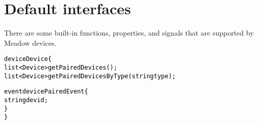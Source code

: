 \documentclass{note}
\begin{document}

\section{Default interfaces}
There are some built-in functions, properties, and signals that are
supported by Meadow devices. 
\begin{alltt}
  \textcolor{black}{device Device \{
    list<Device> getPairedDevices();
    list<Device> getPairedDevicesByType(string type);
    
    event devicePairedEvent \{
      string devid;
    \}
  \}}
\end{alltt}
\end{document}

